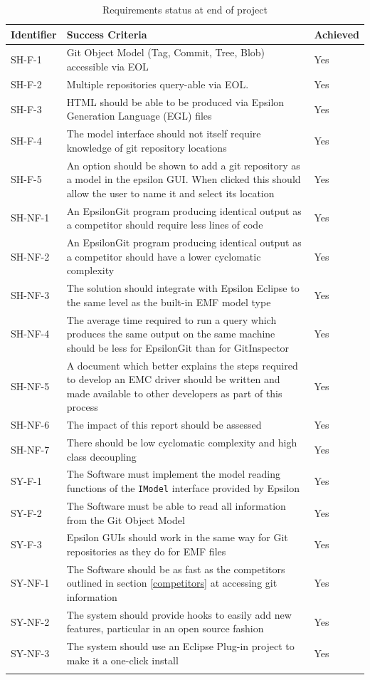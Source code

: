 \documentclass[11pt]{book}
\newcommand{\code}[1]{\texttt{#1}}
\begin{document}
\begin{longtable}{|p{2cm}|p{10cm}|p{3cm}|}
\hline
\textbf{Identifier} & \textbf{Success Criteria} & \textbf{Achieved} \\ \hline
SH-F-1 &  Git Object Model (Tag, Commit, Tree, Blob) accessible via EOL & Yes \\  \hline
SH-F-2 & Multiple repositories query-able via EOL. & Yes  \\ \hline
SH-F-3 & HTML should be able to be produced via Epsilon Generation Language (EGL) files & Yes \\ \hline
SH-F-4 & The model interface should not itself require knowledge of git repository locations & Yes \\ \hline
SH-F-5 & An option should be shown to add a git repository as a model in the epsilon GUI. When clicked this should allow the user to name it and select its location & Yes \\ \hline
SH-NF-1 & An EpsilonGit program producing identical output as a competitor should require less lines of code & Yes \\ \hline
SH-NF-2 & An EpsilonGit program producing identical output as a competitor should have a lower cyclomatic complexity & Yes \\ \hline
SH-NF-3 & The solution should integrate with Epsilon Eclipse to the same level as the built-in EMF model type & Yes \\ \hline
SH-NF-4 & The average time required to run a query which produces the same output on the same machine should be less for EpsilonGit than for GitInspector & Yes \\ \hline
SH-NF-5 & A document which better explains the steps required to develop an EMC driver should be written and made available to other developers as part of this process & Yes \\ \hline
SH-NF-6 & The impact of this report should be assessed & Yes \\ \hline
SH-NF-7 & There should be low cyclomatic complexity and high class decoupling  & Yes \\ \hline
SY-F-1 & The Software must implement the model reading functions of the \code{IModel} interface provided by Epsilon & Yes \\ \hline
SY-F-2 & The Software must be able to read all information from the Git Object Model & Yes \\ \hline
SY-F-3 & Epsilon GUIs should work in the same way for Git repositories as they do for EMF files & Yes \\ \hline
SY-NF-1 & The Software should be as fast as the competitors outlined in section \ref{competitors} at accessing git information & Yes \\ \hline
SY-NF-2 & The system should provide hooks to easily add new features, particular in an open source fashion & Yes \\ \hline
SY-NF-3 & The system should use an Eclipse Plug-in project to make it a one-click install & Yes \\ \hline

\caption{Requirements status at end of project}
\label{tab:reqsats}
\end{longtable}
\end{document}
